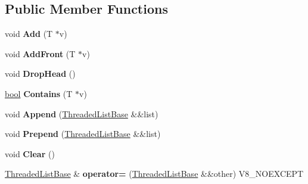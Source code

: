 \subsection*{Public Member Functions}
\begin{DoxyCompactItemize}
\item 
\mbox{\label{classv8_1_1base_1_1ThreadedListBase_a1c7bbaacee48b993cf5f02e69ce09933}} 
void {\bfseries Add} (T $\ast$v)
\item 
\mbox{\label{classv8_1_1base_1_1ThreadedListBase_a07b6a7d12b591bbf13508a0fa94e7504}} 
void {\bfseries Add\+Front} (T $\ast$v)
\item 
\mbox{\label{classv8_1_1base_1_1ThreadedListBase_a444e0db58a83bacaa51008f66d8e144a}} 
void {\bfseries Drop\+Head} ()
\item 
\mbox{\label{classv8_1_1base_1_1ThreadedListBase_a6315eaeefd29ba43d81985a703abf96a}} 
\mbox{\hyperlink{classbool}{bool}} {\bfseries Contains} (T $\ast$v)
\item 
\mbox{\label{classv8_1_1base_1_1ThreadedListBase_a4acba480a73fa18b86f8b571325d228f}} 
void {\bfseries Append} (\mbox{\hyperlink{classv8_1_1base_1_1ThreadedListBase}{Threaded\+List\+Base}} \&\&list)
\item 
\mbox{\label{classv8_1_1base_1_1ThreadedListBase_a238c5b5da836e9a66922fad5dd8b3e25}} 
void {\bfseries Prepend} (\mbox{\hyperlink{classv8_1_1base_1_1ThreadedListBase}{Threaded\+List\+Base}} \&\&list)
\item 
\mbox{\label{classv8_1_1base_1_1ThreadedListBase_af5ed450e36d3b47667df4d80ca82cc08}} 
void {\bfseries Clear} ()
\item 
\mbox{\label{classv8_1_1base_1_1ThreadedListBase_a9ca40ce4cfd151bcf69dfe41ab67cdc8}} 
\mbox{\hyperlink{classv8_1_1base_1_1ThreadedListBase}{Threaded\+List\+Base}} \& {\bfseries operator=} (\mbox{\hyperlink{classv8_1_1base_1_1ThreadedListBase}{Threaded\+List\+Base}} \&\&other) V8\+\_\+\+N\+O\+E\+X\+C\+E\+PT

\end{DoxyCompactItemize}
